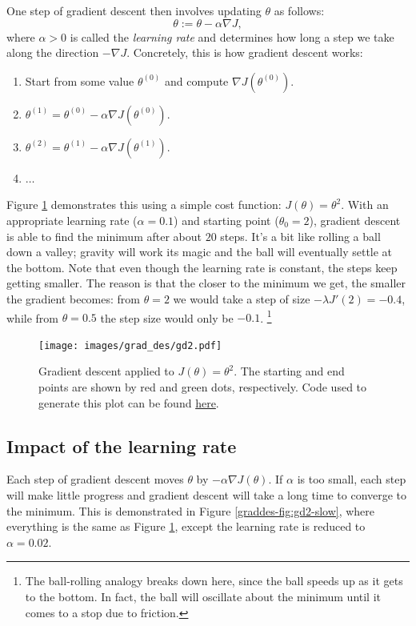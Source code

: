 \documentclass{article}
\theoremstyle{definition}
\begin{document}
One step of gradient descent then involves updating $\theta$ as follows:
\begin{equation}
    \theta := \theta - \alpha \nabla J,
\end{equation}
where $\alpha > 0$ is called the \textit{learning rate} and determines how long a step we take along the direction $-\nabla J$. Concretely, this is how gradient descent works:
\begin{enumerate}
    \item Start from some value $\theta^{(0)}$ and compute $\nabla J(\theta^{(0)})$.
    \item $\theta^{(1)}=\theta^{(0)}-\alpha\nabla J(\theta^{(0)})$.
    \item $\theta^{(2)}=\theta^{(1)}-\alpha\nabla J(\theta^{(1)})$.
    \item $\dots$
\end{enumerate}
Figure \ref{graddes-fig:gd2} demonstrates this using a simple cost function: $J(\theta)=\theta^2$. With an appropriate learning rate ($\alpha=0.1$) and starting point ($\theta_0=2$), gradient descent is able to find the minimum after about $20$ steps. It's a bit like rolling a ball down a valley; gravity will work its magic and the ball will eventually settle at the bottom. Note that even though the learning rate is constant, the steps keep getting smaller. The reason is that the closer to the minimum we get, the smaller the gradient becomes: from $\theta = 2$ we would take a step of size $-\lambda J'(2) = -0.4$, while from $\theta = 0.5$ the step size would only be $-0.1$.
\footnote{
The ball-rolling analogy breaks down here, since the ball speeds up as it gets to the bottom. In fact, the ball will oscillate about the minimum until it comes to a stop due to friction.
}


\begin{figure}[ht]
\centering
\texttt{[image: images/grad\_des/gd2.pdf]}
\caption{Gradient descent applied to $J(\theta)=\theta^2$. The starting and end points are shown by red and green dots, respectively. Code used to generate this plot can be found \href{https://github.com/siavashaslanbeigi/ml_notes/blob/master/src/grad_des/basics.ipynb}{\color{blue} here}.}
\label{graddes-fig:gd2}
\end{figure}


\subsection{Impact of the learning rate}
Each step of gradient descent moves $\theta$ by $-\alpha\nabla J(\theta)$. If $\alpha$ is too small, each step will make little progress and gradient descent will take a long time to converge to the minimum. This is demonstrated in Figure \ref{graddes-fig:gd2-slow}, where everything is the same as Figure \ref{graddes-fig:gd2}, except the learning rate is reduced to $\alpha=0.02$.
\end{document}
